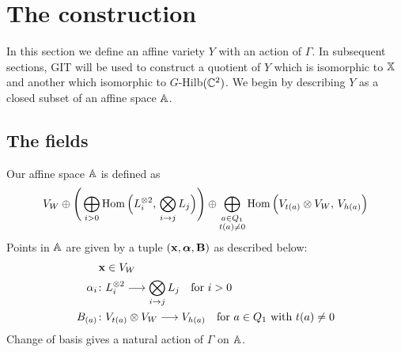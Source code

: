 \documentclass{amsart}
\newcommand{\balpha}{\boldsymbol{\alpha}}
\theoremstyle{definition}
\newcommand\VW{V_W}
\newcommand\Y{Y}
\begin{document}


\section{The construction}

In this section we define an affine variety $\Y$ with an action of $\Gamma$. In subsequent sections, GIT will be used to construct a quotient of $\Y$ which is isomorphic to $\mathbb{X}$ and another which isomorphic to $G$-Hilb$(\mathbb{C}^2)$.
We begin by describing $\Y$ as a closed subset of an affine space $\mathbb{A}$.

\subsection{The fields}
Our affine space $\mathbb{A}$ is defined as
\begin{equation*}
    \VW \oplus \Bigg(\bigoplus_{i>0} \Hom\Big(L_i^{\otimes 2},\, \bigotimes_{i \rightarrow j} L_j\Big) \Bigg) \oplus  \bigoplus_{\substack{a\in Q_1\\t(a)\neq 0}} \Hom\Big(V_{t(a)} \otimes \VW,\,  V_{h(a)}\Big) 
\end{equation*}
Points in $\mathbb{A}$ are given by a tuple $(\bfx,\balpha, \bfB)$ as described below:
\begin{align}
\bfx &\in \VW \label{fd:x} \\
\alpha_i \colon &L_i^{\otimes 2}\longrightarrow \bigotimes_{i \rightarrow j} L_j  \label{fd:alpha}\quad\mbox{for }i>0 \\
 B_{(a)} \colon &V_{t(a)} \otimes \VW \longrightarrow  V_{h(a)} \label{fd:B}\quad\mbox{for }a\in Q_1\mbox{ with } t(a)\neq 0
\end{align}
Change of basis gives a natural action of $\Gamma$ on $\mathbb{A}$.
\end{document}
